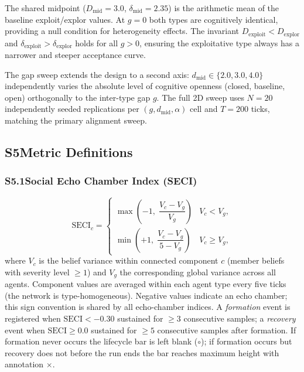 The shared midpoint ($D_{\mathrm{mid}}=3.0$, $\delta_{\mathrm{mid}}=2.35$) is
the arithmetic mean of the baseline exploit/explor values.
At $g=0$ both types are cognitively identical, providing a null condition for
heterogeneity effects.
The invariant $D_{\mathrm{exploit}}<D_{\mathrm{explor}}$ and
$\delta_{\mathrm{exploit}}>\delta_{\mathrm{explor}}$ holds for all $g>0$,
ensuring the exploitative type always has a narrower and steeper acceptance curve.

The gap sweep extends the design to a second axis: $d_{\mathrm{mid}}\in\{2.0,3.0,4.0\}$
independently varies the absolute level of cognitive openness (closed, baseline, open)
orthogonally to the inter-type gap $g$.
The full 2D sweep uses $N=20$ independently seeded replications per $(g,d_{\mathrm{mid}},\alpha)$
cell and $T=200$ ticks, matching the primary alignment sweep.

\subsection*{S5\quad Metric Definitions}

\subsubsection*{S5.1\enspace Social Echo Chamber Index (SECI)}

\begin{equation}
  \mathrm{SECI}_c =
  \begin{cases}
    \max\!\left(-1,\;\dfrac{V_c - V_g}{V_g}\right)
      & V_c < V_g, \\[8pt]
    \min\!\left(+1,\;\dfrac{V_c - V_g}{5 - V_g}\right)
      & V_c \geq V_g,
  \tag{S5}
  \end{cases}
\end{equation}
%
where $V_c$ is the belief variance within connected component $c$ (member beliefs
with severity level $\geq1$) and $V_g$ the corresponding global variance across
all agents.
Component values are averaged within each agent type every five ticks
(the network is type-homogeneous).
Negative values indicate an echo chamber; this sign convention is shared by all
echo-chamber indices.
A \emph{formation} event is registered when $\mathrm{SECI}<-0.30$ sustained for
$\geq3$ consecutive samples; a \emph{recovery} event when
$\mathrm{SECI}\geq0.0$ sustained for $\geq5$ consecutive samples after formation.
If formation never occurs the lifecycle bar is left blank ($\circ$); if formation
occurs but recovery does not before the run ends the bar reaches maximum height
with annotation $\times$.

